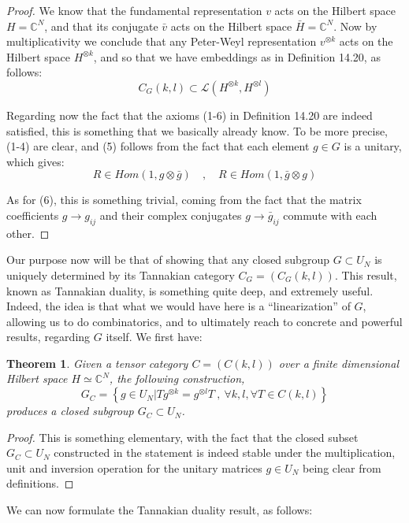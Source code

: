 \documentclass[12pt]{amsbook}
\newtheorem{theorem}{Theorem}[chapter]
\begin{document}
\begin{proof}
We know that the fundamental representation $v$ acts on the Hilbert space $H=\mathbb C^N$, and that its conjugate $\bar{v}$ acts on the Hilbert space $\bar{H}=\mathbb C^N$. Now by multiplicativity we conclude that any Peter-Weyl representation $v^{\otimes k}$ acts on the Hilbert space $H^{\otimes k}$, and so that we have embeddings as in Definition 14.20, as follows:
$$C_G(k,l)\subset\mathcal L(H^{\otimes k},H^{\otimes l})$$

Regarding now the fact that the axioms (1-6) in Definition 14.20 are indeed satisfied, this is something that we basically already know. To be more precise, (1-4) are clear, and (5) follows from the fact that each element $g\in G$ is a unitary, which gives:
$$R\in Hom(1,g\otimes\bar{g})\quad,\quad 
R\in Hom(1,\bar{g}\otimes g)$$

As for (6), this is something trivial, coming from the fact that the matrix coefficients $g\to g_{ij}$ and their complex conjugates $g\to\bar{g}_{ij}$ commute with each other.
\end{proof}

Our purpose now will be that of showing that any closed subgroup $G\subset U_N$ is uniquely determined by its Tannakian category $C_G=(C_G(k,l))$. This result, known as Tannakian duality, is something quite deep, and extremely useful. Indeed, the idea is that what we would have here is a ``linearization'' of $G$, allowing us to do combinatorics, and to ultimately reach to concrete and powerful results, regarding $G$ itself. We first have:

\begin{theorem}
Given a tensor category $C=(C(k,l))$ over a finite dimensional Hilbert space $H\simeq\mathbb C^N$, the following construction,
$$G_C=\left\{g\in U_N\Big|Tg^{\otimes k}=g^{\otimes l}T\ ,\ \forall k,l,\forall T\in C(k,l)\right\}$$
produces a closed subgroup $G_C\subset U_N$.
\end{theorem}

\begin{proof}
This is something elementary, with the fact that the closed subset $G_C\subset U_N$ constructed in the statement is indeed stable under the multiplication, unit and inversion operation for the unitary matrices $g\in U_N$ being clear from definitions.
\end{proof}

We can now formulate the Tannakian duality result, as follows:

\end{document}
